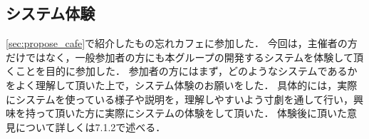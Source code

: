 \documentclass[../report]{subfiles}
\begin{document}
\subsection{システム体験}
\ref{sec:propose_cafe}で紹介したもの忘れカフェに参加した．
今回は，主催者の方だけではなく，一般参加者の方にも本グループの開発するシステムを体験して頂くことを目的に参加した．
参加者の方にはまず，どのようなシステムであるかをよく理解して頂いた上で，システム体験のお願いをした．
具体的には，実際にシステムを使っている様子や説明を，理解しやすいよう寸劇を通して行い，興味を持って頂いた方に実際にシステムの体験をして頂いた．
体験後に頂いた意見について詳しくは7.1.2で述べる．
\end{document}
